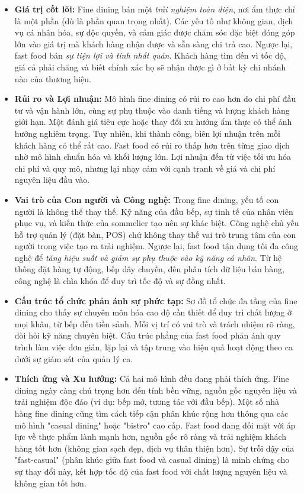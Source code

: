 \begin{itemize}
	\item \textbf{Giá trị cốt lõi:} Fine dining bán một \textit{trải nghiệm toàn diện}, nơi ẩm thực chỉ là một phần (dù là phần quan trọng nhất). Các yếu tố như không gian, dịch vụ cá nhân hóa, sự độc quyền, và cảm giác được chăm sóc đặc biệt đóng góp lớn vào giá trị mà khách hàng nhận được và sẵn sàng chi trả cao. Ngược lại, fast food bán \textit{sự tiện lợi và tính nhất quán}. Khách hàng tìm đến vì tốc độ, giá cả phải chăng và biết chính xác họ sẽ nhận được gì ở bất kỳ chi nhánh nào của thương hiệu.

	\item \textbf{Rủi ro và Lợi nhuận:} Mô hình fine dining có rủi ro cao hơn do chi phí đầu tư và vận hành lớn, cùng sự phụ thuộc vào danh tiếng và lượng khách hàng giới hạn. Một đánh giá tiêu cực hoặc thay đổi xu hướng ẩm thực có thể ảnh hưởng nghiêm trọng. Tuy nhiên, khi thành công, biên lợi nhuận trên mỗi khách hàng có thể rất cao. Fast food có rủi ro thấp hơn trên từng giao dịch nhờ mô hình chuẩn hóa và khối lượng lớn. Lợi nhuận đến từ việc tối ưu hóa chi phí và quy mô, nhưng lại nhạy cảm với cạnh tranh về giá và chi phí nguyên liệu đầu vào.

	\item \textbf{Vai trò của Con người và Công nghệ:} Trong fine dining, yếu tố con người là không thể thay thế. Kỹ năng của đầu bếp, sự tinh tế của nhân viên phục vụ, và kiến thức của sommelier tạo nên sự khác biệt. Công nghệ chủ yếu hỗ trợ quản lý (đặt bàn, POS) chứ không thay thế vai trò trung tâm của con người trong việc tạo ra trải nghiệm. Ngược lại, fast food tận dụng tối đa công nghệ để \textit{tăng hiệu suất và giảm sự phụ thuộc vào kỹ năng cá nhân}. Từ hệ thống đặt hàng tự động, bếp dây chuyền, đến phân tích dữ liệu bán hàng, công nghệ là chìa khóa để duy trì tốc độ và sự đồng nhất.

	\item \textbf{Cấu trúc tổ chức phản ánh sự phức tạp:} Sơ đồ tổ chức đa tầng của fine dining cho thấy sự chuyên môn hóa cao độ cần thiết để duy trì chất lượng ở mọi khâu, từ bếp đến tiền sảnh. Mỗi vị trí có vai trò và trách nhiệm rõ ràng, đòi hỏi kỹ năng chuyên biệt. Cấu trúc phẳng của fast food phản ánh quy trình làm việc đơn giản, lặp lại và tập trung vào hiệu quả hoạt động theo ca dưới sự giám sát của quản lý ca.

	\item \textbf{Thích ứng và Xu hướng:} Cả hai mô hình đều đang phải thích ứng. Fine dining ngày càng chú trọng hơn đến tính bền vững, nguồn gốc nguyên liệu và trải nghiệm độc đáo (ví dụ: bếp mở, tương tác với đầu bếp). Một số nhà hàng fine dining cũng tìm cách tiếp cận phân khúc rộng hơn thông qua các mô hình "casual dining" hoặc "bistro" cao cấp. Fast food đang đối mặt với áp lực về thực phẩm lành mạnh hơn, nguồn gốc rõ ràng và trải nghiệm khách hàng tốt hơn (không gian sạch đẹp, dịch vụ thân thiện hơn). Sự trỗi dậy của "fast-casual" (phân khúc giữa fast food và casual dining) là minh chứng cho sự thay đổi này, kết hợp tốc độ của fast food với chất lượng nguyên liệu và không gian tốt hơn.

\end{itemize}

